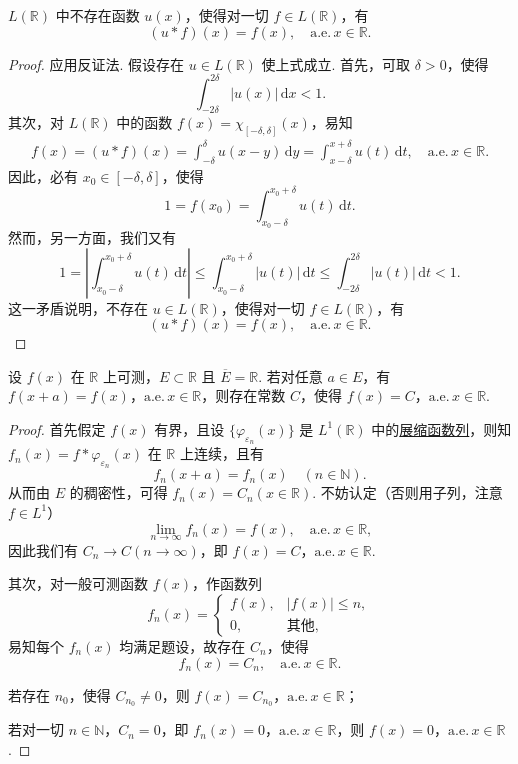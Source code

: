 \documentclass[../../main.tex]{subfiles}
\begin{document}
\begin{proposition}[\( L \) 中无卷积单位]\label{proposition:L中无卷积单位}
\( L(\mathbb{R}) \) 中不存在函数 \( u(x) \)，使得对一切 \( f \in L(\mathbb{R}) \)，有
\[
(u * f)(x) = f(x), \quad \text{a.e.}\, x \in \mathbb{R}.
\]
\end{proposition}
\begin{proof}
应用反证法. 假设存在 \( u \in L(\mathbb{R}) \) 使上式成立. 首先，可取 \( \delta > 0 \)，使得
\[
\int_{-2\delta}^{2\delta} |u(x)| \, \mathrm{d}x < 1.
\]
其次，对 \( L(\mathbb{R}) \) 中的函数 \( f(x) = \chi_{[-\delta, \delta]}(x) \)，易知
\begin{align*}
f(x) = (u * f)(x) = \int_{-\delta}^{\delta} u(x - y) \, \mathrm{d}y = \int_{x - \delta}^{x + \delta} u(t) \, \mathrm{d}t, \quad \text{a.e.}\, x \in \mathbb{R}.
\end{align*}
因此，必有 \( x_0 \in [-\delta, \delta] \)，使得
\[
1 = f(x_0) = \int_{x_0 - \delta}^{x_0 + \delta} u(t) \, \mathrm{d}t.
\]
然而，另一方面，我们又有
\[
1 = \left| \int_{x_0 - \delta}^{x_0 + \delta} u(t) \, \mathrm{d}t \right| \leqslant  \int_{x_0 - \delta}^{x_0 + \delta} |u(t)| \, \mathrm{d}t \leqslant  \int_{-2\delta}^{2\delta} |u(t)| \, \mathrm{d}t < 1.
\]
这一矛盾说明，不存在 \( u \in L(\mathbb{R}) \)，使得对一切 \( f \in L(\mathbb{R}) \)，有
\[
(u * f)(x) = f(x), \quad \text{a.e.}\, x \in \mathbb{R}.
\]
\end{proof}

\begin{example}
设 \( f(x) \) 在 \( \mathbb{R} \) 上可测，\( E \subset \mathbb{R} \) 且 \( \overline{E} = \mathbb{R} \). 若对任意 \( a \in E \)，有 \( f(x + a) = f(x) \)，\(\text{a.e.}\, x \in \mathbb{R} \)，则存在常数 \( C \)，使得 \( f(x) = C \)，\(\text{a.e.}\, x \in \mathbb{R} \).
\end{example}
\begin{proof}
首先假定 \( f(x) \) 有界，且设 \( \{ \varphi_{\varepsilon_n}(x) \} \) 是 \( L^1(\mathbb{R}) \) 中的\hyperref[definition:展缩函数]{展缩函数列}，则知 \( f_n(x) = f * \varphi_{\varepsilon_n}(x) \) 在 \( \mathbb{R} \) 上连续，且有
\[
f_n(x + a) = f_n(x) \quad (n \in \mathbb{N}).
\]
从而由 \( E \) 的稠密性，可得 \( f_n(x) = C_n (x \in \mathbb{R}) \). 不妨认定（否则用子列，注意 \( f \in L^1 \)）
\[
\lim_{n \to \infty} f_n(x) = f(x), \quad \text{a.e.}\, x \in \mathbb{R},
\]
因此我们有 \( C_n \to C (n \to \infty) \)，即 \( f(x) = C \)，\(\text{a.e.}\, x \in \mathbb{R} \).

其次，对一般可测函数 \( f(x) \)，作函数列
\[
f_n(x) = 
\begin{cases} 
f(x), & |f(x)| \leqslant  n, \\
0, & \text{其他},
\end{cases}
\]
易知每个 \( f_n(x) \) 均满足题设，故存在 \( C_n \)，使得
\[
f_n(x) = C_n, \quad \text{a.e.}\, x \in \mathbb{R}.
\]

若存在 \( n_0 \)，使得 \( C_{n_0} \neq 0 \)，则 \( f(x) = C_{n_0} \)，\(\text{a.e.}\, x \in \mathbb{R} \)；

若对一切 \( n \in \mathbb{N} \)，\( C_n = 0 \)，即 \( f_n(x) = 0 \)，\(\text{a.e.}\, x \in \mathbb{R} \)，则 \( f(x) = 0 \)，\(\text{a.e.}\, x \in \mathbb{R} \).
\end{proof}
\end{document}
